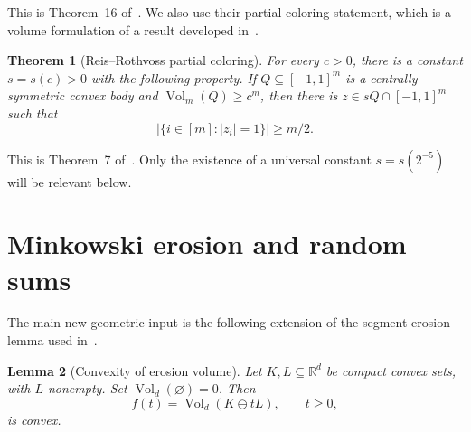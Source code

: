 \documentclass[11pt]{article}
\newtheorem{theorem}{Theorem}[section]
\newtheorem{lemma}[theorem]{Lemma}
\theoremstyle{remark}
\newcommand{\R}{\mathbb{R}}
\newcommand{\Vol}{\operatorname{Vol}}
\newcommand{\MinkDiff}{\mathbin{\ominus}}
\begin{document}
This is Theorem~16 of~\cite{RR26}.  We also use their partial-coloring
statement, which is a volume formulation of a result developed
in~\cite{RR23}.

\begin{theorem}[Reis--Rothvoss partial coloring]\label{thm:RR-coloring}
For every $c>0$, there is a constant $s=s(c)>0$ with the following
property.  If $Q\subseteq[-1,1]^m$ is a centrally symmetric convex
body and $\Vol_m(Q)\geq c^m$, then there is
$z\in sQ\cap[-1,1]^m$ such that
\[
  |\{i\in[m]:|z_i|=1\}|\geq m/2.
\]
\end{theorem}

This is Theorem~7 of~\cite{RR26}.  Only the existence of a universal
constant $s=s(2^{-5})$ will be relevant below.

\section{Minkowski erosion and random sums}\label{sec:erosion}

The main new geometric input is the following extension of the segment
erosion lemma used in~\cite{RR26}.

\begin{lemma}[Convexity of erosion volume]\label{lem:erosion-convex}
Let $K,L\subseteq\R^d$ be compact convex sets, with $L$ nonempty.  Set
$\Vol_d(\varnothing)=0$.  Then
\[
  f(t)=\Vol_d(K\MinkDiff tL),\qquad t\geq0,
\]
is convex.
\end{lemma}
\end{document}

